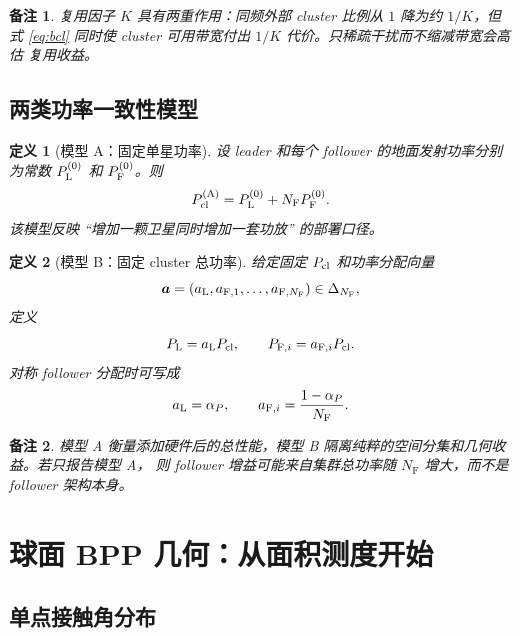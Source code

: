 \documentclass[UTF8,a4paper,11pt]{ctexart}
\newtheorem{definition}{定义}[section]
\newtheorem{remark}{备注}[section]
\newcommand{\NF}{N_{\mathrm F}}
\newcommand{\avec}{\bm a}
\newcommand{\Simplex}{\Delta}
\begin{document}
\begin{remark}
复用因子 $K$ 具有两重作用：同频外部 cluster 比例从 $1$ 降为约 $1/K$，但式
\eqref{eq:bcl} 同时使 cluster 可用带宽付出 $1/K$ 代价。只稀疏干扰而不缩减带宽会高估
复用收益。
\end{remark}

\subsection{两类功率一致性模型}

\begin{definition}[模型 A：固定单星功率]
设 leader 和每个 follower 的地面发射功率分别为常数 $P_{\rm L}^{(0)}$ 和
$P_{\rm F}^{(0)}$。则
\begin{equation}
 P_{\rm cl}^{\rm(A)}
 =P_{\rm L}^{(0)}+\NF P_{\rm F}^{(0)}.
 \label{eq:per-satellite-power}
\end{equation}
该模型反映 ``增加一颗卫星同时增加一套功放'' 的部署口径。
\end{definition}

\begin{definition}[模型 B：固定 cluster 总功率]
给定固定 $P_{\rm cl}$ 和功率分配向量
\begin{equation}
 \avec=(a_{\rm L},a_{{\rm F},1},\ldots,a_{{\rm F},\NF})
 \in\Simplex_{\NF},
 \label{eq:power-simplex}
\end{equation}
定义
\begin{equation}
 P_{\rm L}=a_{\rm L}P_{\rm cl},\qquad
 P_{{\rm F},i}=a_{{\rm F},i}P_{\rm cl}.
 \label{eq:fixed-cluster-power}
\end{equation}
对称 follower 分配时可写成
\begin{equation}
 a_{\rm L}=\alpha_P,\qquad
 a_{{\rm F},i}=\frac{1-\alpha_P}{\NF}.
 \label{eq:power-alpha}
\end{equation}
\end{definition}

\begin{remark}
模型 A 衡量添加硬件后的总性能，模型 B 隔离纯粹的空间分集和几何收益。若只报告模型 A，
则 follower 增益可能来自集群总功率随 $\NF$ 增大，而不是 follower 架构本身。
\end{remark}

\section{球面 BPP 几何：从面积测度开始}

\subsection{单点接触角分布}
\end{document}
